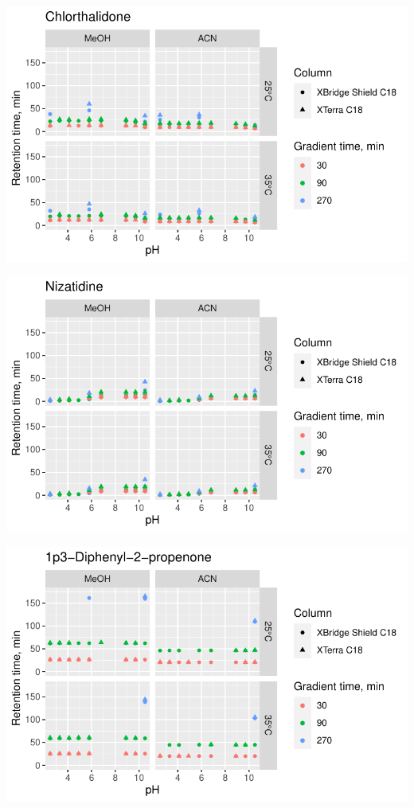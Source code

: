 \documentclass[
  letterpaper,
  DIV=11,
  numbers=noendperiod]{scrreprt}
\begin{document}
\includegraphics{index_files/figure-pdf/unnamed-chunk-4-126.pdf}

\includegraphics{index_files/figure-pdf/unnamed-chunk-4-127.pdf}

\includegraphics{index_files/figure-pdf/unnamed-chunk-4-128.pdf}
\end{document}
